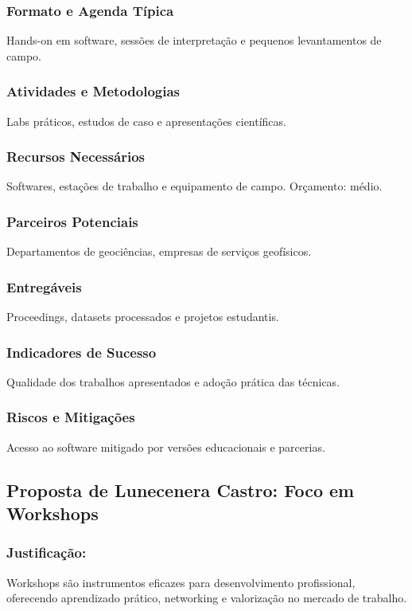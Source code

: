 \documentclass[12pt,a4paper]{article}
\begin{document}
\subsubsection*{Formato e Agenda Típica}
Hands-on em software, sessões de interpretação e pequenos levantamentos de campo.

\subsubsection*{Atividades e Metodologias}
Labs práticos, estudos de caso e apresentações científicas.

\subsubsection*{Recursos Necessários}
Softwares, estações de trabalho e equipamento de campo. Orçamento: médio.

\subsubsection*{Parceiros Potenciais}
Departamentos de geociências, empresas de serviços geofísicos.

\subsubsection*{Entregáveis}
Proceedings, datasets processados e projetos estudantis.

\subsubsection*{Indicadores de Sucesso}
Qualidade dos trabalhos apresentados e adoção prática das técnicas.

\subsubsection*{Riscos e Mitigações}
Acesso ao software mitigado por versões educacionais e parcerias.


\subsection{Proposta de Lunecenera Castro: Foco em Workshops}

\subsubsection*{Justificação:}
Workshops são instrumentos eficazes para desenvolvimento profissional, oferecendo aprendizado prático, networking e valorização no mercado de trabalho.
\end{document}
